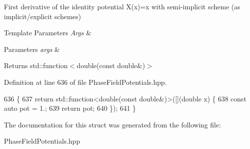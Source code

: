 First derivative of the identity potential X(x)=x with semi-\/implicit scheme (as implicit/explicit schemes) 


\begin{DoxyTemplParams}{Template Parameters}
{\em Args} & \\
\hline
\end{DoxyTemplParams}

\begin{DoxyParams}{Parameters}
{\em args} & \\
\hline
\end{DoxyParams}
\begin{DoxyReturn}{Returns}
std\+::function$<$double(const double\&)$>$ 
\end{DoxyReturn}


Definition at line 636 of file Phase\+Field\+Potentials.\+hpp.


\begin{DoxyCode}
636                                                         \{
637     \textcolor{keywordflow}{return} std::function<double(const double&)>([](\textcolor{keywordtype}{double} x) \{
638       \textcolor{keyword}{const} \textcolor{keyword}{auto} pot = 1.;
639       \textcolor{keywordflow}{return} pot;
640     \});
641   \}
\end{DoxyCode}


The documentation for this struct was generated from the following file\+:\begin{DoxyCompactItemize}
\item 
Phase\+Field\+Potentials.\+hpp\end{DoxyCompactItemize}
